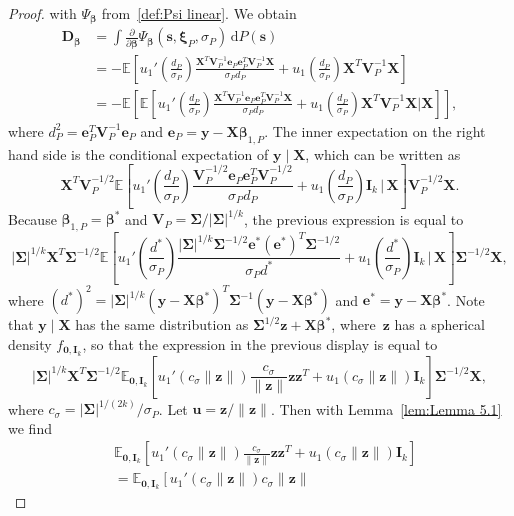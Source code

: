 \documentclass[10pt,a4paper]{amsart}
\newcommand{\E}{\mathbb{E}}
\newcommand{\bD}{\mathbf{D}}
\newcommand{\bI}{\mathbf{I}}
\newcommand{\bSigma}{\mathbf{\Sigma}}
\newcommand{\bV}{\mathbf{V}}
\newcommand{\bX}{\mathbf{X}}
\newcommand{\bbeta}{\bm\beta}
\newcommand{\be}{\mathbf{e}}
\newcommand{\bs}{\mathbf{s}}
\newcommand{\bu}{\mathbf{u}}
\newcommand{\bxi}{\bm\xi}
\newcommand{\by}{\mathbf{y}}
\newcommand{\bz}{\mathbf{z}}
\newcommand{\dd}{\mathrm{d}}
\begin{document}
\begin{proof}
with $\Psi_{\bbeta}$ from~\eqref{def:Psi linear}.
We obtain
\begin{equation}
\label{eq:Dbeta elliptical}
\begin{split}
\bD_{\bbeta}
&=
\int
\frac{\partial}{\partial \bbeta}
\Psi_{\bbeta}(\bs,\bxi_P,\sigma_P)\,\dd P(\bs)\\
&=
-\E
\left[
u_1'\left(\frac{d_P}{\sigma_P}\right)
\frac{\bX^T\bV_P^{-1}\be_P
\be_P^T
\bV_P^{-1}\bX}{\sigma_P d_P}
+
u_1\left(\frac{d_P}{\sigma_P}\right)\bX^T\bV_P^{-1}\bX
\right]\\
&=
-\E
\left[
\E
\left[
u_1'\left(\frac{d_P}{\sigma_P}\right)
\frac{\bX^T\bV_P^{-1}\be_P
\be_P^T
\bV_P^{-1}\bX}{\sigma_P d_P}
+
u_1\left(\frac{d_P}{\sigma_P}\right)\bX^T\bV_P^{-1}\bX
\bigg|
\bX
\right]
\right],
\end{split}
\end{equation}
where $d_P^2=\be_P^T\bV_P^{-1}\be_P$ and $\be_P=\by-\bX\bbeta_{1,P}$.
The inner expectation on the right hand side is the conditional expectation of $\by\mid\bX$,
which can be written as
\[
\bX^T\bV_P^{-1/2}
\E
\left[
u_1'\left(\frac{d_P}{\sigma_P}\right)
\frac{\bV_P^{-1/2}\be_P
\be_P^T
\bV_P^{-1/2}}{\sigma_P d_P}
+
u_1\left(\frac{d_P}{\sigma_P}\right)\bI_k
\,\Bigg|\,
\bX
\right]
\bV_P^{-1/2}\bX.
\]
Because $\bbeta_{1,P}=\bbeta^*$ and $\bV_P=\bSigma/|\bSigma|^{1/k}$, the previous expression is equal to
\[
|\bSigma|^{1/k}
\bX^T\bSigma^{-1/2}
\E
\left[
u_1'\left(\frac{d^*}{\sigma_P}\right)
\frac{|\bSigma|^{1/k}\bSigma^{-1/2}\be^*(\be^*)^T\bSigma^{-1/2}}{\sigma_Pd^*}
+
u_1\left(\frac{d^*}{\sigma_P}\right)\bI_k
\,\Bigg|\,
\bX
\right]
\bSigma^{-1/2}\bX,
\]
where $(d^*)^2=|\bSigma|^{1/k}(\by-\bX\bbeta^*)^T\bSigma^{-1}(\by-\bX\bbeta^*)$ and $\be^*=\by-\bX\bbeta^*$.
Note that $\by\mid\bX$ has the same distribution as $\bSigma^{1/2}\bz+\bX\bbeta^*$,
where~$\bz$ has a spherical density $f_{\mathbf{0},\bI_k}$,
so that the expression in the previous display is equal to
\[
|\bSigma|^{1/k}
\bX^T
\bSigma^{-1/2}
\mathbb{E}_{\mathbf{0},\bI_k}
\left[
u_1'\left(c_\sigma\|\bz\|\right)
\frac{c_\sigma}{\|\bz\|}
\bz\bz^T
+
u_1\left(c_\sigma\|\bz\|\right)
\bI_k
\right]
\bSigma^{-1/2}
\bX,
\]
where $c_\sigma=|\bSigma|^{1/(2k)}/\sigma_P$.
Let $\bu=\bz/\|\bz\|$.
Then with Lemma~\ref{lem:Lemma 5.1} we find
\[
\begin{split}
&
\mathbb{E}_{\mathbf{0},\bI_k}
\left[
u_1'\left(c_\sigma\|\bz\|\right)
\frac{c_\sigma}{\|\bz\|}
\bz\bz^T
+
u_1\left(c_\sigma\|\bz\|\right)
\bI_k
\right]\\
&=
\mathbb{E}_{\mathbf{0},\bI_k}
\left[
u_1'\left(c_\sigma\|\bz\|\right)c_\sigma\|\bz\|

\end{split}\]
\end{proof}
\end{document}
